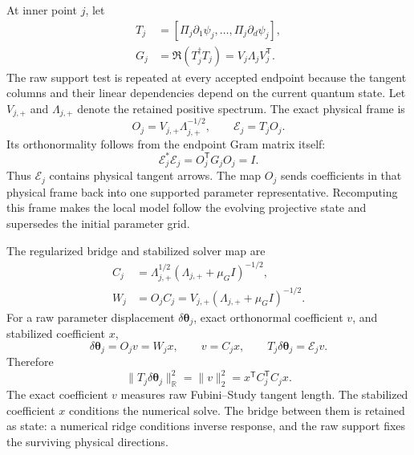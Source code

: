 \documentclass[10pt,twocolumn]{article}
\begin{document}
At inner point \(j\), let
\begin{align}
T_j&=[\Pi_j\partial_1\psi_j,\ldots,\Pi_j\partial_d\psi_j],\nonumber\\
G_j&=\Re(T_j^\dagger T_j)
=V_j\Lambda_jV_j^{\mathsf T}.
\label{eq:fm-inner-gram}
\end{align}
The raw support test is repeated at every accepted endpoint because the tangent
columns and their linear dependencies depend on the current quantum state. Let
\(V_{j,+}\) and \(\Lambda_{j,+}\) denote the retained positive spectrum. The
exact physical frame is
\begin{equation}
O_j=V_{j,+}\Lambda_{j,+}^{-1/2},
\qquad
\mathcal E_j=T_jO_j.
\label{eq:fm-exact-frame}
\end{equation}
Its orthonormality follows from the endpoint Gram matrix itself:
\begin{equation}
\mathcal E_j^*\mathcal E_j
=O_j^{\mathsf T}G_jO_j=I.
\label{eq:fm-frame-identity}
\end{equation}
Thus \(\mathcal E_j\) contains physical tangent arrows. The map \(O_j\) sends
coefficients in that physical frame back into one supported parameter
representative. Recomputing this frame makes the local model follow the
evolving projective state and supersedes the initial parameter grid.

The regularized bridge and stabilized solver map are
\begin{align}
C_j&=\Lambda_{j,+}^{1/2}
(\Lambda_{j,+}+\mu_GI)^{-1/2},\nonumber\\
W_j&=O_jC_j
=V_{j,+}(\Lambda_{j,+}+\mu_GI)^{-1/2}.
\label{eq:fm-maps}
\end{align}
For a raw parameter displacement \(\delta\bm\theta_j\), exact orthonormal
coefficient \(v\), and stabilized coefficient \(x\),
\begin{equation}
\delta\bm\theta_j=O_jv=W_jx,
\qquad
v=C_jx,
\qquad
T_j\delta\bm\theta_j=\mathcal E_jv.
\label{eq:fm-coordinate-bridge}
\end{equation}
Therefore
\begin{equation}
\|T_j\delta\bm\theta_j\|_{\mathbb R}^2
=\|v\|_2^2
=x^{\mathsf T}C_j^{\mathsf T}C_jx.
\label{eq:fm-coordinate-length}
\end{equation}
The exact coefficient \(v\) measures raw Fubini--Study tangent length. The
stabilized coefficient \(x\) conditions the numerical solve. The bridge
between them is retained as state: a numerical ridge conditions inverse
response, and the raw support fixes the surviving physical directions.
\end{document}
